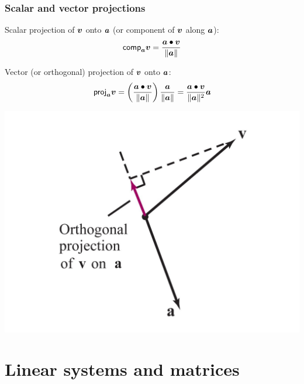 \documentclass[aspectratio=169]{beamer}\usepackage[]{graphicx}\usepackage[]{xcolor}
\begin{document}
\begin{frame}
\frametitle{Scalar and vector projections}
	Scalar projection of $\bm{v}$ onto $\bm{a}$ (or component of $\bm{v}$ along $\bm{a}$):
	\[
  	\mathsf{comp}_{\bm{a}}\bm{v}=
  	\frac{\bm{a}\bullet\bm{v}}{\|\bm{a}\|}
	\]
	\begin{minipage}{0.59\textwidth}
		Vector (or orthogonal) projection of $\bm{v}$ onto $\bm{a}$:
		\[
		\mathsf{proj}_{\bm{a}}\bm{v}=
		  \left(
		    \frac{\bm{a}\bullet\bm{v}}{\|\bm{a}\|}
		  \right)
		  \frac{\bm{a}}{\|\bm{a}\|}
		  =\frac{\bm{a}\bullet\bm{v}}{\|\bm{a}\|^2}\bm{a}
		\]
	\end{minipage}
	\begin{minipage}{0.39\textwidth}
		\begin{center}
			\includegraphics[width=1.1\textwidth]{FIGS/proj_v_onto_a}
		\end{center}
	\end{minipage}
\end{frame}


\section{Linear systems and matrices}
\end{document}
